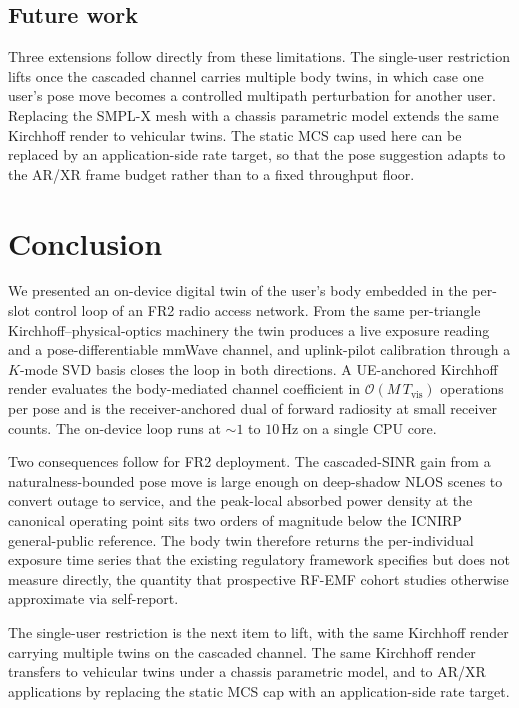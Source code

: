 \documentclass[journal,twocolumn,10pt]{IEEEtran}
\theoremstyle{plain}
\theoremstyle{definition}
\theoremstyle{remark}
\begin{document}
\subsection{Future work}

Three extensions follow directly from these limitations. The
single-user restriction lifts once the cascaded channel
carries multiple body twins, in which case one user's pose move
becomes a controlled multipath perturbation for another user.
Replacing the SMPL-X mesh with a chassis parametric model
extends the same Kirchhoff render to vehicular twins. The static
MCS cap used here can be replaced by an application-side rate
target, so that the pose suggestion adapts to the AR/XR frame
budget rather than to a fixed throughput floor.


\section{Conclusion}\label{sec:conclusion}

We presented an on-device digital twin of the user's body
embedded in the per-slot control loop of an FR2 radio access
network. From the same per-triangle Kirchhoff--physical-optics
machinery the twin produces a live exposure reading and a
pose-differentiable mmWave channel, and uplink-pilot calibration
through a $K$-mode SVD basis closes the loop in both directions.
A UE-anchored Kirchhoff render evaluates the body-mediated
channel coefficient in $\mathcal{O}(M\,T_{\mathrm{vis}})$
operations per pose and is the receiver-anchored dual of forward
radiosity at small receiver counts. The on-device loop runs at
$\sim\!1$ to $10\,$Hz on a single CPU core.

Two consequences follow for FR2 deployment. The cascaded-SINR
gain from a naturalness-bounded pose move is large enough on
deep-shadow NLOS scenes to convert outage to service, and the
peak-local absorbed power density at the canonical operating
point sits two orders of magnitude below the ICNIRP
general-public reference. The body twin therefore returns the
per-individual exposure time series that the existing
regulatory framework specifies but does not measure directly,
the quantity that prospective RF-EMF cohort studies otherwise
approximate via self-report.

The single-user restriction is the next item to lift, with the
same Kirchhoff render carrying multiple twins on the cascaded
channel. The same Kirchhoff render transfers to vehicular
twins under a chassis parametric model, and to AR/XR
applications by replacing the static MCS cap with an
application-side rate target.
\end{document}
